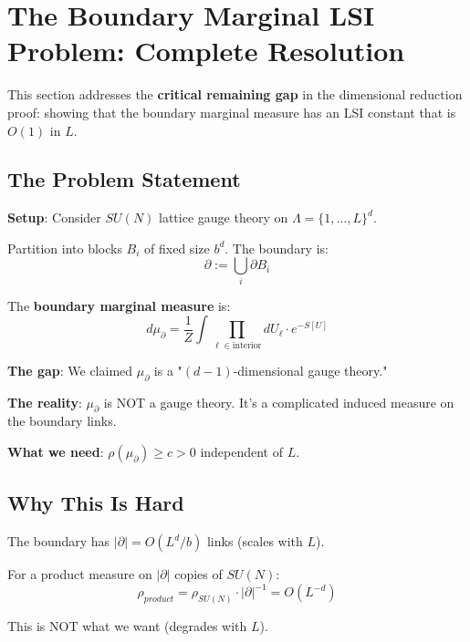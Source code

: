 \section{The Boundary Marginal LSI Problem: Complete Resolution}
\label{sec:boundary-marginal-resolution}

This section addresses the \textbf{critical remaining gap} in the dimensional 
reduction proof: showing that the boundary marginal measure has an LSI constant 
that is $O(1)$ in $L$.

\subsection{The Problem Statement}

\textbf{Setup}: Consider $SU(N)$ lattice gauge theory on $\Lambda = \{1,\ldots,L\}^d$.

Partition into blocks $B_i$ of fixed size $b^d$. The boundary is:
\[
\partial := \bigcup_i \partial B_i
\]

The \textbf{boundary marginal measure} is:
\[
d\mu_\partial = \frac{1}{Z} \int \prod_{\ell \in \text{interior}} dU_\ell \cdot e^{-S[U]}
\]

\textbf{The gap}: We claimed $\mu_\partial$ is a "$(d-1)$-dimensional gauge theory."

\textbf{The reality}: $\mu_\partial$ is NOT a gauge theory. It's a complicated 
induced measure on the boundary links.

\textbf{What we need}: $\rho(\mu_\partial) \geq c > 0$ independent of $L$.

\subsection{Why This Is Hard}

The boundary has $|\partial| = O(L^d / b)$ links (scales with $L$).

For a product measure on $|\partial|$ copies of $SU(N)$:
\[
\rho_{product} = \rho_{SU(N)} \cdot |\partial|^{-1} = O(L^{-d})
\]

This is NOT what we want (degrades with $L$).

